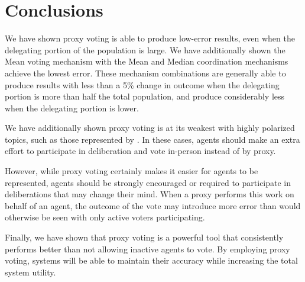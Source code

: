 \section{Conclusions}\label{sec:conclusions}
We have shown proxy voting is able to produce low-error results, even when the
delegating portion of the population is large.
We have additionally shown the Mean voting mechanism with the Mean and Median
coordination mechanisms achieve the lowest error.
These mechanism combinations are generally able to produce results with less than a 5\%
change in outcome when the delegating portion is more than half the total
population, and produce considerably less when the delegating portion is lower.

We have additionally shown proxy voting is at its weakest with highly polarized
topics, such as those represented by .
In these cases, agents should make an extra effort to participate in deliberation and
vote in-person instead of by proxy.

However, while proxy voting certainly makes it easier for agents to be represented,
agents should be strongly encouraged or required to participate in deliberations that
may change their mind.
When a proxy performs this work on behalf of an agent, the outcome of the vote may
introduce more error than would otherwise be seen with only active voters participating.

Finally, we have shown that proxy voting is a powerful tool that consistently
performs better than not allowing inactive agents to vote.
By employing proxy voting, systems will be able to maintain their accuracy while
increasing the total system utility.
